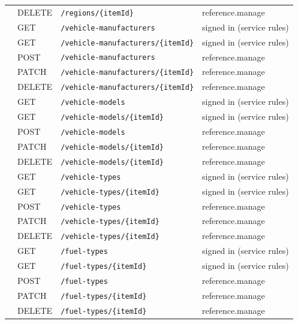 \begin{longtable}{@{}p{2.1cm}l p{6.6cm} p{3.2cm}@{}}
 & DELETE & \texttt{/\allowbreak{}regions/\allowbreak{}\{itemId\}} & reference.manage \\
 & GET & \texttt{/\allowbreak{}vehicle-manufacturers} & signed in (service rules) \\
 & GET & \texttt{/\allowbreak{}vehicle-manufacturers/\allowbreak{}\{itemId\}} & signed in (service rules) \\
 & POST & \texttt{/\allowbreak{}vehicle-manufacturers} & reference.manage \\
 & PATCH & \texttt{/\allowbreak{}vehicle-manufacturers/\allowbreak{}\{itemId\}} & reference.manage \\
 & DELETE & \texttt{/\allowbreak{}vehicle-manufacturers/\allowbreak{}\{itemId\}} & reference.manage \\
 & GET & \texttt{/\allowbreak{}vehicle-models} & signed in (service rules) \\
 & GET & \texttt{/\allowbreak{}vehicle-models/\allowbreak{}\{itemId\}} & signed in (service rules) \\
 & POST & \texttt{/\allowbreak{}vehicle-models} & reference.manage \\
 & PATCH & \texttt{/\allowbreak{}vehicle-models/\allowbreak{}\{itemId\}} & reference.manage \\
 & DELETE & \texttt{/\allowbreak{}vehicle-models/\allowbreak{}\{itemId\}} & reference.manage \\
 & GET & \texttt{/\allowbreak{}vehicle-types} & signed in (service rules) \\
 & GET & \texttt{/\allowbreak{}vehicle-types/\allowbreak{}\{itemId\}} & signed in (service rules) \\
 & POST & \texttt{/\allowbreak{}vehicle-types} & reference.manage \\
 & PATCH & \texttt{/\allowbreak{}vehicle-types/\allowbreak{}\{itemId\}} & reference.manage \\
 & DELETE & \texttt{/\allowbreak{}vehicle-types/\allowbreak{}\{itemId\}} & reference.manage \\
 & GET & \texttt{/\allowbreak{}fuel-types} & signed in (service rules) \\
 & GET & \texttt{/\allowbreak{}fuel-types/\allowbreak{}\{itemId\}} & signed in (service rules) \\
 & POST & \texttt{/\allowbreak{}fuel-types} & reference.manage \\
 & PATCH & \texttt{/\allowbreak{}fuel-types/\allowbreak{}\{itemId\}} & reference.manage \\
 & DELETE & \texttt{/\allowbreak{}fuel-types/\allowbreak{}\{itemId\}} & reference.manage \\

\end{longtable}
